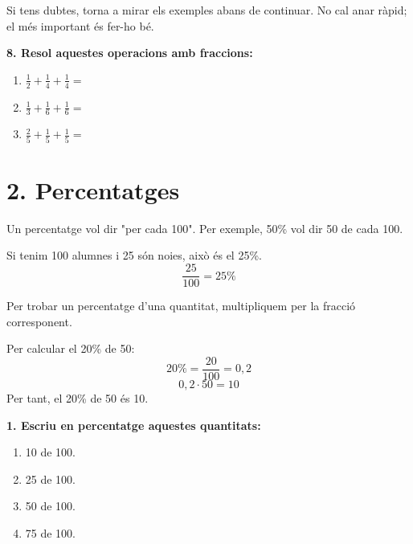\documentclass[12pt,a4paper]{article}
\begin{document}
\begin{capsula}
Si tens dubtes, torna a mirar els exemples abans de continuar. No cal anar ràpid; el més important és fer-ho bé.
\end{capsula}

\textbf{8. Resol aquestes operacions amb fraccions:}
\begin{enumerate}[label=\alph*)]
    \item \(\frac{1}{2}+\frac{1}{4}+\frac{1}{4}=\) \vspace{0.8cm}
    \item \(\frac{1}{3}+\frac{1}{6}+\frac{1}{6}=\) \vspace{0.8cm}
    \item \(\frac{2}{5}+\frac{1}{5}+\frac{1}{5}=\) \vspace{0.8cm}
\end{enumerate}

\newpage

\section*{2. Percentatges}

\begin{capsula}
Un percentatge vol dir "per cada 100". Per exemple, 50\% vol dir 50 de cada 100.
\end{capsula}

\begin{exemple}
Si tenim 100 alumnes i 25 són noies, això és el 25\%.
\[
\frac{25}{100}=25\%
\]
\end{exemple}

\begin{capsula}
Per trobar un percentatge d'una quantitat, multipliquem per la fracció corresponent.
\end{capsula}

\begin{exemple}
Per calcular el 20\% de 50:
\[
20\%=\frac{20}{100}=0,2
\]
\[
0,2\cdot 50=10
\]
Per tant, el 20\% de 50 és 10.
\end{exemple}

\textbf{1. Escriu en percentatge aquestes quantitats:}
\begin{enumerate}[label=\alph*)]
    \item 10 de 100. \vspace{0.6cm}
    \item 25 de 100. \vspace{0.6cm}
    \item 50 de 100. \vspace{0.6cm}
    \item 75 de 100. \vspace{0.6cm}
\end{enumerate}
\end{document}
